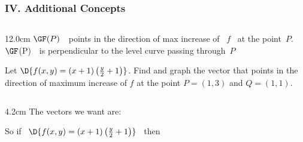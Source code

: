 \begin{frame}
\frametitle{IV. Additional Concepts}
\scriptsize
\begin{columns}
\begin{column}{12.0cm}
	\THM \OBUL $\GF(P)$ \,\, points in the direction of max increase of \, $f$ \, at the point \,$P$.  \\
	\vspace{0.1cm}
	\hspace{0.73cm} \OBUL $\GF$(P) \,\, is perpendicular to the level curve passing through \,$P$
	
\vspace{0.2cm}

\EX Let $\D{f(x,y) = (x+1)\left(\frac{y}{2}+1\right)}$. Find and graph the vector that points in the direction of \NEWLINE maximum increase of $f$ at the point $P = (1,3)$ and $Q = (1,1)$.

\vspace{0.2cm}

\begin{columns}
\begin{column}{4.2cm}
The vectors we want are: 

\vspace{0.1cm}
 
\hspace{1.4cm} 

\vspace{0.2cm}

So if \, $\D{f(x,y) = (x+1)\left(\frac{y}{2}+1\right)}$ \, then

\vspace{0.4cm}


\vspace{0.2cm}

%


%

\vspace{0.5cm}



\end{column}
\end{columns}
\end{column}
\end{columns}
\end{frame}
